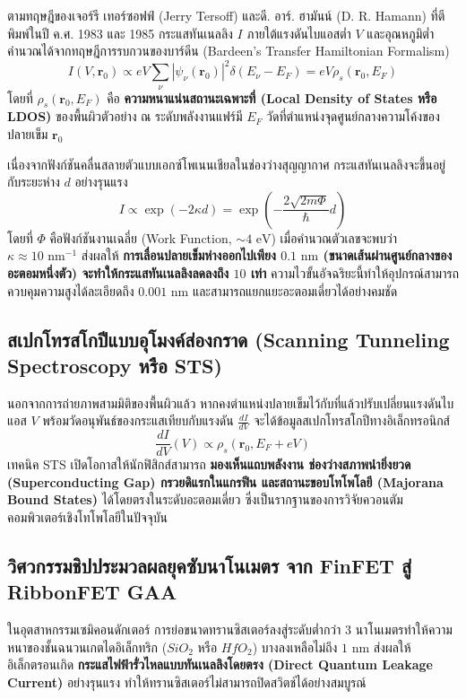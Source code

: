 ตามทฤษฎีของเจอร์รี เทอร์ซอฟฟ์ (Jerry Tersoff) และดี. อาร์. ฮามันน์ (D. R. Hamann) ที่ตีพิมพ์ในปี ค.ศ. 1983 และ 1985 กระแสทันเนลลิง $I$ ภายใต้แรงดันไบแอสต่ำ $V$ และอุณหภูมิต่ำคำนวณได้จากทฤษฎีการรบกวนของบาร์ดีน (Bardeen's Transfer Hamiltonian Formalism)
\begin{equation}
I(V, \mathbf{r}_0) \propto e V \sum_{\nu} |\psi_\nu(\mathbf{r}_0)|^2 \delta(E_\nu - E_F) = e V \rho_s(\mathbf{r}_0, E_F)
\end{equation}
โดยที่ $\rho_s(\mathbf{r}_0, E_F)$ คือ \textbf{ความหนาแน่นสถานะเฉพาะที่ (Local Density of States หรือ LDOS)} ของพื้นผิวตัวอย่าง ณ ระดับพลังงานแฟร์มี $E_F$ วัดที่ตำแหน่งจุดศูนย์กลางความโค้งของปลายเข็ม $\mathbf{r}_0$

เนื่องจากฟังก์ชันคลื่นสลายตัวแบบเอกซ์โพเนนเชียลในช่องว่างสุญญากาศ กระแสทันเนลลิงจะขึ้นอยู่กับระยะห่าง $d$ อย่างรุนแรง
\begin{equation}
I \propto \exp\left( -2\kappa d \right) = \exp\left( -\frac{2\sqrt{2m\Phi}}{\hbar} d \right)
\end{equation}
โดยที่ $\Phi$ คือฟังก์ชันงานเฉลี่ย (Work Function, $\sim 4\text{ eV}$) เมื่อคำนวณตัวเลขจะพบว่า $\kappa \approx 10\text{ nm}^{-1}$ ส่งผลให้ \textbf{การเลื่อนปลายเข็มห่างออกไปเพียง $0.1\text{ nm}$ (ขนาดเส้นผ่านศูนย์กลางของอะตอมหนึ่งตัว) จะทำให้กระแสทันเนลลิงลดลงถึง $10$ เท่า} ความไวขั้นอัจฉริยะนี้ทำให้อุปกรณ์สามารถควบคุมความสูงได้ละเอียดถึง $0.001\text{ nm}$ และสามารถแยกแยะอะตอมเดี่ยวได้อย่างคมชัด

\subsection{สเปกโทรสโกปีแบบอุโมงค์ส่องกราด (Scanning Tunneling Spectroscopy หรือ STS)}
นอกจากการถ่ายภาพสามมิติของพื้นผิวแล้ว หากคงตำแหน่งปลายเข็มไว้กับที่แล้วปรับเปลี่ยนแรงดันไบแอส $V$ พร้อมวัดอนุพันธ์ของกระแสเทียบกับแรงดัน $\frac{dI}{dV}$ จะได้ข้อมูลสเปกโทรสโกปีทางอิเล็กทรอนิกส์
\begin{equation}
\frac{dI}{dV}(V) \propto \rho_s(\mathbf{r}_0, E_F + e V)
\end{equation}
เทคนิค STS เปิดโอกาสให้นักฟิสิกส์สามารถ \textbf{มองเห็นแถบพลังงาน ช่องว่างสภาพนำยิ่งยวด (Superconducting Gap) กรวยดิแรกในแกรฟีน และสถานะขอบโทโพโลยี (Majorana Bound States)} ได้โดยตรงในระดับอะตอมเดี่ยว ซึ่งเป็นรากฐานของการวิจัยควอนตัมคอมพิวเตอร์เชิงโทโพโลยีในปัจจุบัน

\subsection{วิศวกรรมชิปประมวลผลยุคซับนาโนเมตร จาก FinFET สู่ RibbonFET GAA}
ในอุตสาหกรรมเซมิคอนดักเตอร์ การย่อขนาดทรานซิสเตอร์ลงสู่ระดับต่ำกว่า 3 นาโนเมตรทำให้ความหนาของชั้นฉนวนเกตไดอิเล็กทริก ($SiO_2$ หรือ $HfO_2$) บางลงเหลือไม่ถึง $1\text{ nm}$ ส่งผลให้อิเล็กตรอนเกิด \textbf{กระแสไฟฟ้ารั่วไหลแบบทันเนลลิงโดยตรง (Direct Quantum Leakage Current)} อย่างรุนแรง ทำให้ทรานซิสเตอร์ไม่สามารถปิดสวิตช์ได้อย่างสมบูรณ์

